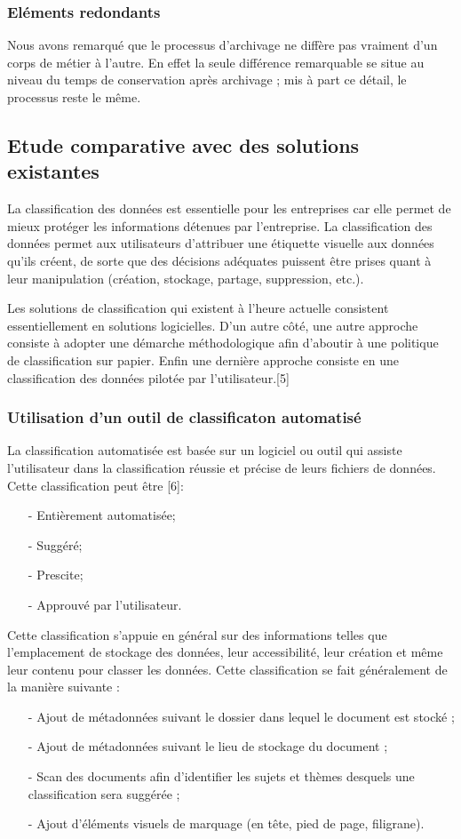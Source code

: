 \subsubsection{Eléments redondants}
Nous avons remarqué que le processus d’archivage ne diffère pas vraiment d’un corps de métier à l’autre. En effet la seule différence remarquable se situe au niveau du temps de conservation après archivage ; mis à part ce détail, le processus reste le même.

\subsection{Etude comparative avec des solutions existantes}
La classification des données est essentielle pour les entreprises car elle permet de mieux protéger les informations détenues par l’entreprise. La classification des données permet aux utilisateurs d’attribuer une étiquette visuelle aux données qu’ils créent, de sorte que des décisions adéquates puissent être prises quant à leur manipulation (création, stockage, partage, suppression, etc.).

Les solutions de classification qui existent à l’heure actuelle consistent essentiellement en solutions logicielles. D’un autre côté, une autre approche consiste à adopter une démarche méthodologique afin d’aboutir à une politique de classification sur papier. Enfin une dernière approche consiste en une classification des données pilotée par l’utilisateur.[5]

\subsubsection{Utilisation d'un outil de classificaton automatisé}
La classification automatisée est basée sur un logiciel ou outil qui assiste l’utilisateur dans la classification réussie et précise de leurs fichiers de données. Cette classification peut être [6]:
\begin{itemize}
    \item[-] Entièrement automatisée;
    \item[-] Suggéré;
    \item[-] Prescite;
    \item[-] Approuvé par l'utilisateur.
\end{itemize}
Cette classification s’appuie en général sur des informations telles que l’emplacement de stockage des données, leur accessibilité, leur création et même leur contenu pour classer les données. Cette classification se fait généralement de la manière suivante :
\begin{itemize}
    \item[-] Ajout de métadonnées suivant le dossier dans lequel le document est stocké ;
    \item[-] Ajout de métadonnées suivant le lieu de stockage du document ;
    \item[-] Scan des documents afin d’identifier les sujets et thèmes desquels une classification sera suggérée ;
    \item[-] Ajout d’éléments visuels de marquage (en tête, pied de page, filigrane).
\end{itemize}

